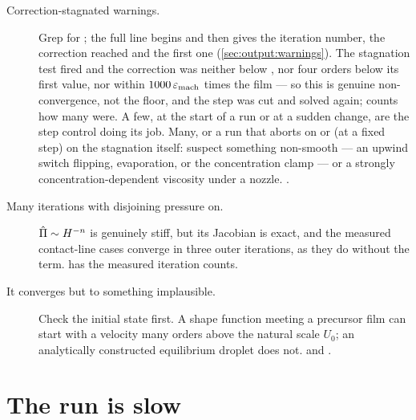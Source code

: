 \begin{description}
  \item[Correction-stagnated warnings.] Grep  for
    ; the full line begins
     and then gives the iteration number, the correction reached
    and the first one (\cref{sec:output:warnings}). The stagnation test fired
    and the correction was neither below , nor four orders
    below its first value, nor within $1000\,\varepsilon_{\mathrm{mach}}$ times the film --- so this
    is genuine non-convergence, not the floor, and the step was cut and
    solved again;  counts how many were. A few, at the
    start of a run or at a sudden change, are the step control doing its
    job. Many, or a run that aborts on  or (at a fixed step) on
    the stagnation itself: suspect something non-smooth --- an upwind switch
    flipping, evaporation, or the concentration clamp --- or a strongly
    concentration-dependent viscosity under a nozzle.
    .
  \item[Many iterations with disjoining pressure on.] $\hat{\Pi} \sim H^{-n}$ is
    genuinely stiff, but its Jacobian is exact, and the measured contact-line
    cases converge in three outer iterations, as they do without the term.
     has the measured iteration counts.
  \item[It converges but to something implausible.] Check the initial state
    first. A shape function meeting a precursor film can start with a velocity
    many orders above the natural scale $U_0$; an analytically constructed
    equilibrium droplet does not.  and
    .
\end{description}

\section{The run is slow}
\label{sec:trouble:slow}

